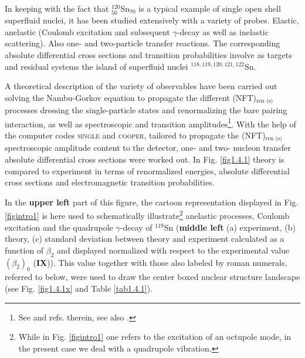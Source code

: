 In keeping with the fact that $^{120}_{50}$Sn$_{70}$ is a 
 typical example of single open shell superfluid nuclei, it has been studied extensively with a variety of probes.  Elastic, anelastic (Coulomb excitation and subsequent $\gamma$-decay as well as inelastic scattering). Also one- and two-particle transfer reactions. The corresponding absolute differential cross sections and transition probabilities  involve as targets and residual systems the island of superfluid nuclei $^{118,119,120,121,122}$Sn.
 
 
  A theoretical description of the variety of observables  have been carried out  solving the Nambu-Gorkov equation to propagate the different  (NFT)$_{\text{ren (s)}}$ processes dressing the single-particle states and renormalizing the bare pairing interaction, as well as spectroscopic and transition amplitudes\footnote{See \cite{Idini:15} and refs. therein, see also \cite{Broglia:16}.}. With the help of the computer codes \textsc{single} and \textsc{cooper}, tailored to propagate the (NFT)$_{\text{ren (s)}}$ spectroscopic amplitude content to the detector, one- and two- nucleon transfer absolute differential cross sections were worked out. In Fig. \ref{fig1.4.1} theory is compared to experiment in terms of renormalized energies, absolute differential cross sections and electromagnetic transition probabilities. 
  
  
In the \textbf{upper left} part of this figure, the cartoon representation displayed in Fig. \ref{figintro1} is here used to schematically illustrate\footnote{While in Fig. \ref{figintro1} one refers to the excitation of an octupole mode, in the present case we deal with a quadrupole vibration.}  anelastic processes, Coulomb excitation and the quadrupole $\gamma$-decay of $^{119}$Sn (\textbf{middle left} (a) experiment, (b) theory, (c) standard deviation between theory and experiment calculated as a function of $\beta_2$ and displayed normalized with respect to the experimental value $(\beta_2)_0$ (\textbf{IX})). This   value together with those also labeled by roman numerals, referred to below, were used to draw the center boxed nuclear structure landscape (see Fig. \ref{fig1.4.1x} and Table \ref{tab1.4.1}).   
  
